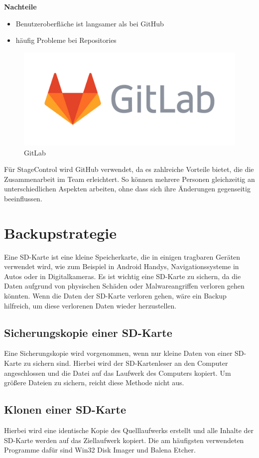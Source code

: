 \textbf{Nachteile}
\begin{itemize}
	\item Benutzeroberfläche ist langsamer als bei GitHub
	\item häufig Probleme bei Repositories 
\end{itemize}


\begin{figure}[H]
	\centering
	\includegraphics[width=0.5\linewidth]{images/GitLab.png}
	\caption[GitLab]{GitLab}
	\label{fig:GitLab}
\end{figure}

Für StageControl wird GitHub verwendet, da es zahlreiche Vorteile bietet, die die Zusammenarbeit im Team erleichtert. So können mehrere Personen gleichzeitig an unterschiedlichen Aspekten arbeiten, ohne dass sich ihre Änderungen gegenseitig beeinflussen.

\section{Backupstrategie}
Eine SD-Karte ist eine kleine Speicherkarte, die in einigen tragbaren Geräten verwendet wird, wie zum Beispiel in Android Handys, Navigationssysteme in Autos oder in Digitalkameras. Es ist wichtig eine SD-Karte zu sichern, da die Daten aufgrund von physischen Schäden oder Malwareangriffen verloren gehen könnten. Wenn die Daten der SD-Karte verloren gehen, wäre ein Backup hilfreich, um diese verlorenen Daten wieder herzustellen.  \parencite{SD-KartenSicherung}

\subsection{Sicherungskopie einer SD-Karte}
Eine Sicherungskopie wird vorgenommen, wenn nur kleine Daten von einer SD-Karte zu sichern sind. Hierbei wird der SD-Kartenleser an den Computer angeschlossen und die Datei auf das Laufwerk des Computers kopiert. Um größere Dateien zu sichern, reicht diese Methode nicht aus. \parencite{SD-KartenSicherung}

\subsection{Klonen einer SD-Karte}
Hierbei wird eine identische Kopie des Quelllaufwerks erstellt und alle Inhalte der SD-Karte werden auf das Ziellaufwerk kopiert. Die am häufigsten verwendeten Programme dafür sind Win32 Disk Imager und Balena Etcher. \parencite{SD-KartenSicherung}

